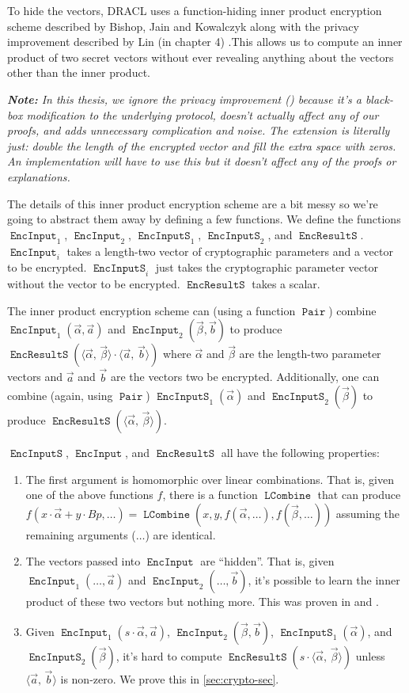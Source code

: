\documentclass[pdftex,12pt,a4papaer,twoside,notitlepage]{report}
\newcommand{\note}[1]{\vspace{1em} \begin{spacing}{1}\textit{\textbf{Note:} #1}\end{spacing}\vspace{1em}}
\newcommand{\iprod}[2]{\langle #1,\,#2\rangle}
\DeclareMathOperator{\ein}{\mathtt{EncInput}}
\DeclareMathOperator{\combine}{\mathtt{LCombine}}
\DeclareMathOperator{\eins}{\mathtt{EncInputS}}
\DeclareMathOperator{\eouts}{\mathtt{EncResultS}}
\DeclareMathOperator{\pair}{\mathtt{Pair}}
\begin{document}
To hide the vectors, DRACL uses a function-hiding inner product encryption
scheme described by Bishop, Jain and Kowalczyk \cite{inner-product} along with
the privacy improvement described by Lin (in chapter 4)
\cite{inner-product-ext}.This allows us to compute an inner product of two
secret vectors without ever revealing anything about the vectors other than the
inner product.

\note{In this thesis, we ignore the privacy improvement
  (\cite{inner-product-ext}) because it's a black-box modification to the
  underlying protocol, doesn't actually affect any of our proofs, and adds
  unnecessary complication and noise. The extension is literally just: double
  the length of the encrypted vector and fill the extra space with zeros. An
  implementation will have to use this but it doesn't affect any of the proofs
  or explanations.}

\newcommand{\Ap}{\vec{\alpha}}
\newcommand{\Bp}{\vec{\beta}}
\newcommand{\ABp}{\iprod{\Ap}{\Bp}}

The details of this inner product encryption scheme are a bit messy so we're
going to abstract them away by defining a few functions. We define the functions
\allowbreak$\ein_1$, $\ein_2$, $\eins_1$, $\eins_2$, and $\eouts$. $\ein_i$
takes a length-two vector of cryptographic parameters and a vector to be
encrypted. $\eins_i$ just takes the cryptographic parameter vector without the
vector to be encrypted. $\eouts$ takes a scalar.

The inner product encryption scheme can (using a function $\pair$) combine
\allowbreak$\ein_1(\Ap, \vec{a})$ and \allowbreak$\ein_2(\Bp, \vec{b})$ to
produce $\eouts(\ABp\cdot\iprod{\vec{a}}{\vec{b}})$ where $\Ap$ and $\Bp$ are
the length-two parameter vectors and $\vec{a}$ and $\vec{b}$ are the vectors two
be encrypted. Additionally, one can combine (again, using $\pair$)
$\eins_1(\Ap)$ and $\eins_2(\Bp)$ to produce $\eouts(\ABp)$.

$\eins$, $\ein$, and $\eouts$ all have the following properties: 
\begin{enumerate}
\item The first argument is homomorphic over linear combinations. That is, given
  one of the above functions $f$, there is a function $\combine$ that can
  produce $f(x\cdot \Ap + y\cdot Bp, \ldots) = \combine(x, y, f(\Ap,
  \ldots),f(\Bp, \ldots))$ assuming the remaining arguments
  ($\ldots$) are identical.
\item The vectors passed into $\ein$ are ``hidden''. That is, given
  $\ein_1(\ldots, \vec{a})$ and $\ein_2(\ldots, \vec{b})$, it's possible to
  learn the inner product of these two vectors but nothing more. This was proven
  in \cite{inner-product} and \cite{inner-product-ext}.
\item Given $\ein_1(s \cdot \Ap, \vec{a})$, \allowbreak$\ein_2(\Bp, \vec{b})$,
  \allowbreak$\eins_1(\Ap)$, and \allowbreak$\eins_2(\Bp)$, it's hard to compute
  $\eouts(s\cdot\ABp)$ unless $\iprod{\vec{a}}{\vec{b}}$ is non-zero. We prove
  this in \cref{sec:crypto-sec}.
\end{enumerate}
\end{document}
